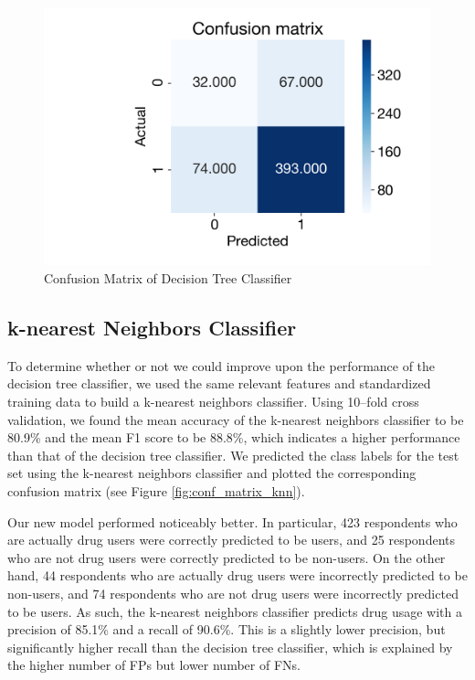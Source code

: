 \documentclass[10pt]{article}
\begin{document}
\begin{figure}[H]
\caption{Confusion Matrix of Decision Tree Classifier}
\label{fig:conf_matrix_dt}
\centering
\includegraphics[scale=0.4]{conf_matrix_dt.png}
\end{figure}

\subsection*{k-nearest Neighbors Classifier}

To determine whether or not we could improve upon the performance of the decision tree classifier, we used the same relevant features and standardized training data to build a k-nearest neighbors classifier. Using 10–fold cross validation, we found the mean accuracy of the k-nearest neighbors classifier to be 80.9\% and the mean F1 score to be 88.8\%, which indicates a higher performance than that of the decision tree classifier. We predicted the class labels for the test set using the k-nearest neighbors classifier and plotted the corresponding confusion matrix (see Figure \ref{fig:conf_matrix_knn}).

Our new model performed noticeably better. In particular, 423 respondents who are actually drug users were correctly predicted to be users, and 25 respondents who are not drug users were correctly predicted to be non-users. On the other hand, 44 respondents who are actually drug users were incorrectly predicted to be non-users, and 74 respondents who are not drug users were incorrectly predicted to be users. As such, the k-nearest neighbors classifier predicts drug usage with a precision of 85.1\% and a recall of 90.6\%. This is a slightly lower precision, but significantly higher recall than the decision tree classifier, which is explained by the higher number of FPs but lower number of FNs.
\end{document}
